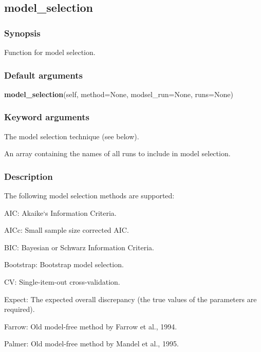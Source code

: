 


\newpage

\subsection{model\_selection}


\subsubsection{Synopsis}

Function for model selection.

\subsubsection{Default arguments}

\textsf{\textbf{model\_selection}(self, method=None, modsel\_run=None, runs=None)}


\subsubsection{Keyword arguments}

  The model selection technique (see below).

  An array containing the names of all runs to include in model selection.

\subsubsection{Description}

The following model selection methods are supported:

AIC:  Akaike`s Information Criteria.

AICc:  Small sample size corrected AIC.

BIC:  Bayesian or Schwarz Information Criteria.

Bootstrap:  Bootstrap model selection.

CV:  Single-item-out cross-validation.

Expect:  The expected overall discrepancy (the true values of the parameters are required).

Farrow:  Old model-free method by Farrow et al., 1994.

Palmer:  Old model-free method by Mandel et al., 1995.

